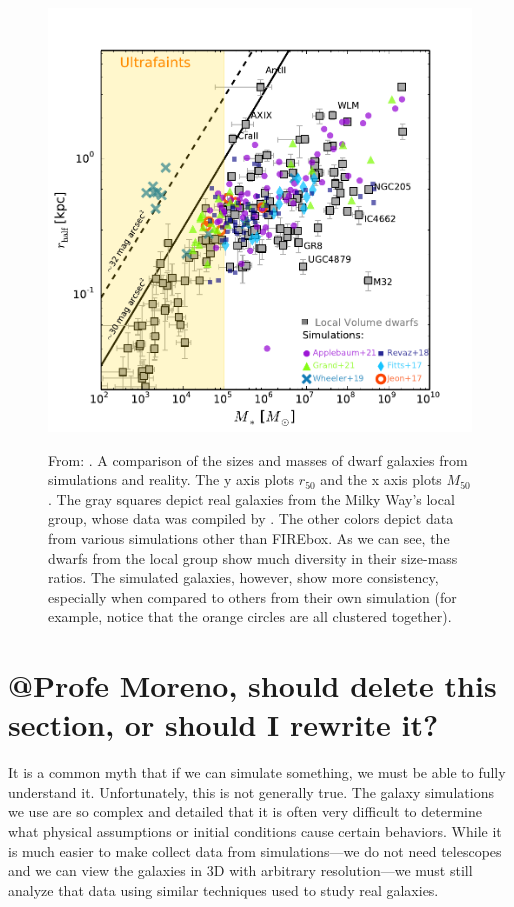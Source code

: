 \begin{figure}
    \centering
    \includegraphics*[width=\textwidth*2/3]{figs/sales/fig4.pdf}
    \label{fig:sales-size-mass}
    \caption{
        From: \cite{salesBaryonicSolutionsChallenges2022}. A comparison of the sizes and masses of dwarf galaxies from simulations and reality. The y axis plots $r_{50}$ and the x axis plots $M_{50}$. The gray squares depict real galaxies from the Milky Way's local group, whose data was compiled by \cite{mcconnachieOBSERVEDPROPERTIESDWARF2012}. The other colors depict data from various simulations other than FIREbox. As we can see, the dwarfs from the local group show much diversity in their size-mass ratios. The simulated galaxies, however, show more consistency, especially when compared to others from their own simulation (for example, notice that the orange circles are all clustered together).
    }
\end{figure}

\section{@Profe Moreno, should delete this section, or should I rewrite it?}
It is a common myth that if we can simulate something, we must be able to fully understand it. Unfortunately, this is not generally true. The galaxy simulations we use are so complex and detailed that it is often very difficult to determine what physical assumptions or initial conditions cause certain behaviors. While it is much easier to make collect data from simulations---we do not need telescopes and we can view the galaxies in 3D with arbitrary resolution---we must still analyze that data using similar techniques used to study real galaxies.

